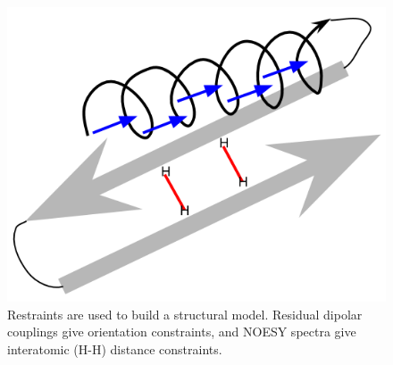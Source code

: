 \begin{figure}
  \includegraphics[scale=0.6]{figures/structure_restraints}
  \caption[Restraints are used to build a structural model.]
          {Restraints are used to build a structural model.
           Residual dipolar couplings give orientation constraints,
           and NOESY spectra give interatomic (H-H) distance constraints.}
  \label{structure_restraints}
\end{figure}

